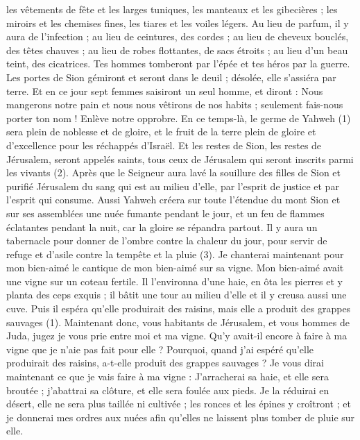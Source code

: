 \begin{multicols}{2}
les vêtements de fête et les larges tuniques, les manteaux et les gibecières ;
les miroirs et les chemises fines, les tiares et les voiles légers.
Au lieu de parfum, il y aura de l’infection ; au lieu de ceintures, des cordes ; au lieu de cheveux bouclés, des têtes chauves ; au lieu de robes flottantes, de sacs étroits ; au lieu d'un beau teint, des cicatrices.
Tes hommes tomberont par l'épée et tes héros par la guerre.
Les portes de Sion gémiront et seront dans le deuil ; désolée, elle s’assiéra par terre.
\VerseOne{}Et en ce jour sept femmes saisiront un seul homme, et diront : Nous mangerons notre pain et nous nous vêtirons de nos habits ; seulement fais-nous porter ton nom ! Enlève notre opprobre.
En ce temps-là, le germe de Yahweh (1) sera plein de noblesse et de gloire, et le fruit de la terre plein de gloire et d'excellence pour les réchappés d'Israël.
Et les restes de Sion, les restes de Jérusalem, seront appelés saints, tous ceux de Jérusalem qui seront inscrits parmi les vivants (2).
Après que le Seigneur aura lavé la souillure des filles de Sion et purifié Jérusalem du sang qui est au milieu d'elle, par l’esprit de justice et par l’esprit qui consume.
Aussi Yahweh créera sur toute l'étendue du mont Sion et sur ses assemblées une nuée fumante pendant le jour, et un feu de flammes éclatantes pendant la nuit, car la gloire se répandra partout.
Il y aura un tabernacle pour donner de l'ombre contre la chaleur du jour, pour servir de refuge et d'asile contre la tempête et la pluie (3).
\VerseOne{}Je chanterai maintenant pour mon bien-aimé le cantique de mon bien-aimé sur sa vigne. Mon bien-aimé avait une vigne sur un coteau fertile.
Il l'environna d'une haie, en ôta les pierres et y planta des ceps exquis ; il bâtit une tour au milieu d'elle et il y creusa aussi une cuve. Puis il espéra qu'elle produirait des raisins, mais elle a produit des grappes sauvages (1).
Maintenant donc, vous habitants de Jérusalem, et vous hommes de Juda, jugez je vous prie entre moi et ma vigne.
Qu'y avait-il encore à faire à ma vigne que je n’aie pas fait pour elle ? Pourquoi, quand j’ai espéré qu'elle produirait des raisins, a-t-elle produit des grappes sauvages ?
Je vous dirai maintenant ce que je vais faire à ma vigne : J’arracherai sa haie, et elle sera broutée ; j’abattrai sa clôture, et elle sera foulée aux pieds.
Je la réduirai en désert, elle ne sera plus taillée ni cultivée ; les ronces et les épines y croîtront ; et je donnerai mes ordres aux nuées afin qu'elles ne laissent plus tomber de pluie sur elle.

\end{multicols}
